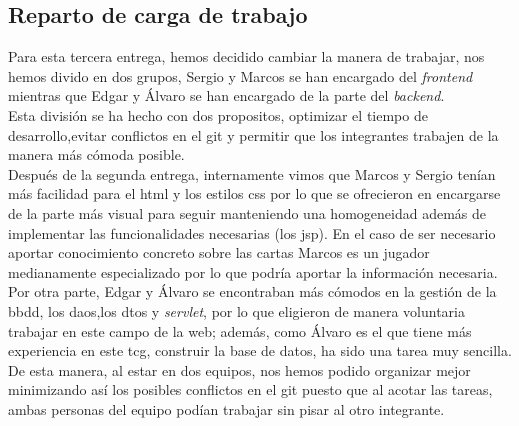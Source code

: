 \documentclass[10pt]{article}
\begin{document}
		\subsection{Reparto de carga de trabajo}
			Para esta tercera entrega, hemos decidido cambiar la manera de trabajar, nos hemos divido en dos grupos, Sergio y Marcos se han encargado del \textit{frontend} mientras que Edgar y Álvaro se han encargado de la parte del \textit{backend}.\\
			Esta división se ha hecho con dos propositos, optimizar el tiempo de desarrollo,evitar conflictos en el git y permitir que los integrantes trabajen de la manera más cómoda posible.\\
			Después de la segunda entrega, internamente vimos que Marcos y Sergio tenían más facilidad para el html y los estilos css por lo que se ofrecieron en encargarse de la parte más visual para seguir manteniendo una homogeneidad además de implementar las funcionalidades necesarias (los jsp). En el caso de ser necesario aportar conocimiento concreto sobre las cartas Marcos es un jugador medianamente especializado por lo que podría aportar la información necesaria.\\
			Por otra parte, Edgar y Álvaro se encontraban más cómodos en la gestión de la bbdd, los daos,los dtos y \textit{servlet}, por lo que eligieron de manera voluntaria trabajar en este campo de la web; además, como Álvaro es el que tiene más experiencia en este tcg, construir la base de datos, ha sido una tarea muy sencilla.\\
			De esta manera, al estar en dos equipos, nos hemos podido organizar mejor minimizando así los posibles conflictos en el git puesto que al acotar las tareas, ambas personas del equipo podían trabajar sin pisar al otro integrante.
			
\end{document}
